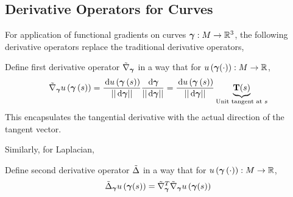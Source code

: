 \documentclass[../dissertation.tex]{subfiles}
\begin{document}
\subsection{Derivative Operators for Curves}
For application of functional gradients on curves $\boldsymbol{\gamma}: M \rightarrow \mathbb{R}^3$,
the following derivative operators replace the traditional derivative operators,
\begin{definition}
    Define first derivative operator\cite{YSC2021} $\tilde{\nabla}_{\boldsymbol{\gamma}}$ in a way that for $u \left( \boldsymbol{\gamma} (\cdot) \right): M \rightarrow \mathbb{R}$,
    \begin{equation}
        \tilde{\nabla}_{\boldsymbol{\gamma}} u \left( \boldsymbol{\gamma} \left( s \right) \right)
        = \frac{\, \text{d} u \left( \boldsymbol{\gamma} \left( s \right) \right)}{\lvert \lvert \, \text{d} \boldsymbol{\gamma} \rvert \rvert} \frac{\, \text{d} \boldsymbol{\gamma}}{\lvert \lvert \, \text{d} \boldsymbol{\gamma} \rvert \rvert}
        = \frac{\, \text{d} u \left( \boldsymbol{\gamma} \left( s \right) \right)}{\lvert \lvert \, \text{d} \boldsymbol{\gamma} \rvert \rvert} \underbrace{\mathbf{T}(s)}_{\text{Unit tangent at } s}
        \label{equ: Curve Gradient Operator}
    \end{equation}
    This encapsulates the tangential derivative with the actual direction of the tangent vector.
\end{definition}

Similarly, for Laplacian,
\begin{definition}
    Define second derivative operator $\tilde{\Delta}$ in a way that for $u \left( \boldsymbol{\gamma} \left( \cdot \right) \right): M \rightarrow \mathbb{R}$,
    \begin{equation}
        \tilde{\Delta}_{\boldsymbol{\gamma}} u \left( \boldsymbol{\gamma} (s) \right) = \tilde{\nabla}_{\boldsymbol{\gamma}}^{T} \tilde{\nabla}_{\boldsymbol{\gamma}} u \left( \boldsymbol{\gamma} (s) \right)
    \end{equation}
\end{definition}
\end{document}

